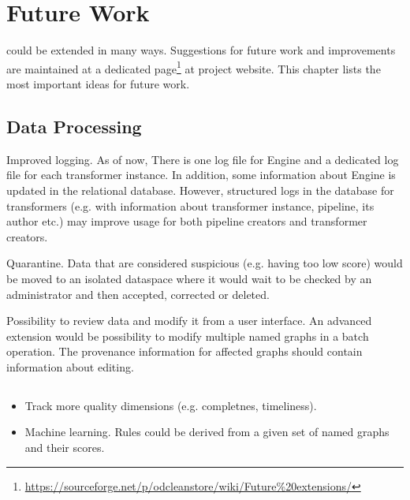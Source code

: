 \chapter{Future Work}
\odcs could be extended in many ways. Suggestions for future work and improvements are maintained at a dedicated page\footnote{\url{https://sourceforge.net/p/odcleanstore/wiki/Future\%20extensions/}} at project website. This chapter lists the most important ideas for future work.

\section{Data Processing}
\item Improved logging. As of now, There is one log file for Engine and a dedicated log file for each transformer instance. In addition, some information about Engine is updated in the relational database. However, structured logs in the database for transformers (e.g. with information about transformer instance, pipeline, its author etc.) may improve usage for both pipeline creators and transformer creators.
\item Quarantine. Data that are considered suspicious (e.g. having too low \QA score) would be moved to an isolated dataspace where it would wait to be checked by an administrator and then accepted, corrected or deleted.
\item Possibility to review data and modify it from a user interface. An advanced extension would be possibility to modify multiple named graphs in a batch operation. The provenance information for affected graphs should contain information about editing.

\section{\FE}

\section{\QA}
\begin{itemize}
	\item Track more quality dimensions (e.g. completnes, timeliness).
	\item Machine learning. Rules could be derived from a given set of named graphs and their scores.
\end{itemize}

